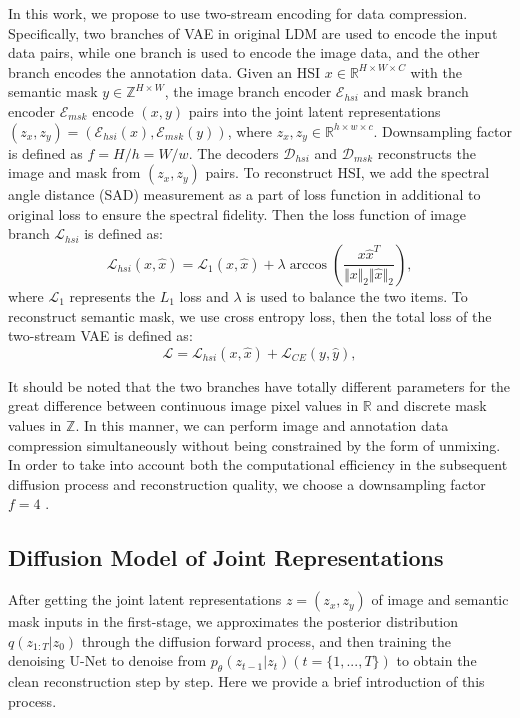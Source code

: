 In this work, we propose to use two-stream encoding for data compression. Specifically, two branches of VAE in original LDM are used to encode the input data pairs, while one branch is used to encode the image data, and the other branch encodes the annotation data. Given an HSI $x\in\mathbb{R}^{H\times W\times C}$ with the semantic mask $y\in\mathbb{Z}^{H\times W}$, the image branch encoder $\mathcal{E}_{hsi}$ and mask branch encoder $\mathcal{E}_{msk}$ encode $(x, y)$ pairs into the joint latent representations $(z_x, z_y) = (\mathcal{E}_{hsi}(x), \mathcal{E}_{msk}(y))$, where $z_x, z_y \in\mathbb{R}^{h\times w\times c}$. Downsampling factor is defined as $f = H/h = W/w$. The decoders $\mathcal{D}_{hsi}$ and $\mathcal{D}_{msk}$ reconstructs the image and mask from $(z_x, z_y)$ pairs. To reconstruct HSI, we add the spectral angle distance (SAD) measurement as a part of loss function in additional to original loss to ensure the spectral fidelity. Then the loss function of image branch $\mathcal L_{hsi}$ is defined as:
\begin{equation}
\label{eq:image loss}
    \mathcal L_{hsi} (x, \hat{x}) = \mathcal L_1(x, \hat{x}) + \lambda \arccos(\frac{x\hat{x}^T}{\Vert x\Vert_2\Vert \hat{x}\Vert_2}),
\end{equation}
where $\mathcal L_1$ represents the $L_1$ loss and $\lambda$ is used to balance the two items. To reconstruct semantic mask, we use cross entropy loss, then the total loss of the two-stream VAE is defined as:
\begin{equation}
    \mathcal{L} = \mathcal L_{hsi}(x, \hat{x}) +\mathcal L_{CE} (y, \hat{y}),
\end{equation}

It should be noted that the two branches have totally different parameters for the great difference between continuous image pixel values in $\mathbb{R}$ and discrete mask values in $\mathbb{Z}$. In this manner, we can perform image and annotation data compression simultaneously without being constrained by the form of unmixing. In order to take into account both the computational efficiency in the subsequent diffusion process and reconstruction quality, we choose a downsampling factor $f = 4$ \cite{ldm}.

\subsection{Diffusion Model of Joint Representations}

After getting the joint latent representations $z = (z_x, z_y)$ of image and semantic mask inputs in the first-stage, we approximates the posterior distribution $q(z_{1:T}|z_0)$ through the diffusion forward process, and then training the denoising U-Net to denoise from $p_\theta(z_{t-1}|z_t)(t=\{1, ..., T\})$ to obtain the clean reconstruction step by step. Here we provide a brief introduction of this process.

